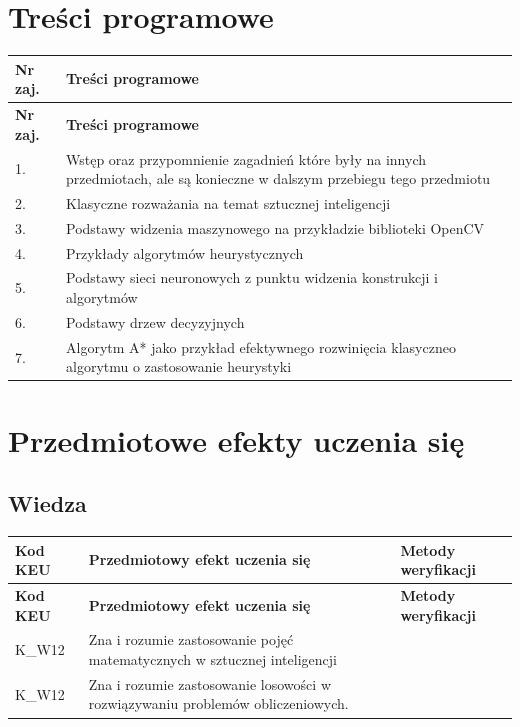 \documentclass[12pt, a4paper]{article}
\newcommand{\thdrule}{\noalign{\global\setlength{\extrarowheight}{0pt}}}
\newcommand{\thdend}{\noalign{\global\setlength{\extrarowheight}{3pt}}}
\begin{document}
\section{Treści programowe}

{\scriptsize
\begin{longtable}{m{1.5cm}m{14.5cm}}
\thdrule\toprule
\rowcolor{pjatkRed} {\color{white}\textbf{Nr zaj.}} & {\color{white}\textbf{Treści programowe}} \\
\midrule\thdend
\endfirsthead
\thdrule\toprule
\rowcolor{pjatkRed} {\color{white}\textbf{Nr zaj.}} & {\color{white}\textbf{Treści programowe}} \\
\midrule\thdend
\endhead
  \rowcolor{tableRowLight} 1. & Wstęp oraz przypomnienie zagadnień które były na innych przedmiotach, ale są konieczne w dalszym przebiegu tego przedmiotu \\
  \rowcolor{tableRowAlt} 2. & Klasyczne rozważania na temat sztucznej inteligencji \\
  \rowcolor{tableRowLight} 3. & Podstawy widzenia maszynowego na przykładzie biblioteki OpenCV \\
  \rowcolor{tableRowAlt} 4. & Przykłady algorytmów heurystycznych \\
  \rowcolor{tableRowLight} 5. & Podstawy sieci neuronowych z punktu widzenia konstrukcji i algorytmów \\
  \rowcolor{tableRowAlt} 6. & Podstawy drzew decyzyjnych \\
  \rowcolor{tableRowLight} 7. & Algorytm A* jako przykład efektywnego rozwinięcia klasyczneo algorytmu o zastosowanie heurystyki \\
\bottomrule
\end{longtable}}

\section{Przedmiotowe efekty uczenia się}

\subsection*{Wiedza}
{\scriptsize
\begin{longtable}{m{1.6cm}m{9.0cm}m{4.2cm}}
\thdrule\toprule
\rowcolor{pjatkRed} {\color{white}\footnotesize\textbf{\vphantom{Ag}Kod KEU}} & {\color{white}\footnotesize\textbf{\vphantom{Ag}Przedmiotowy efekt uczenia się}} & {\color{white}\footnotesize\textbf{\vphantom{Ag}Metody weryfikacji}} \\
\midrule\thdend
\endfirsthead
\thdrule\toprule
\rowcolor{pjatkRed} {\color{white}\footnotesize\textbf{\vphantom{Ag}Kod KEU}} & {\color{white}\footnotesize\textbf{\vphantom{Ag}Przedmiotowy efekt uczenia się}} & {\color{white}\footnotesize\textbf{\vphantom{Ag}Metody weryfikacji}} \\
\midrule\thdend
\endhead
  \rowcolor{tableRowLight} K\_W12 & Zna i rozumie zastosowanie pojęć matematycznych w sztucznej inteligencji &  \\
  \rowcolor{tableRowAlt} K\_W12 & Zna i rozumie zastosowanie losowości w rozwiązywaniu problemów obliczeniowych. &  \\
\bottomrule
\end{longtable}}
\end{document}
